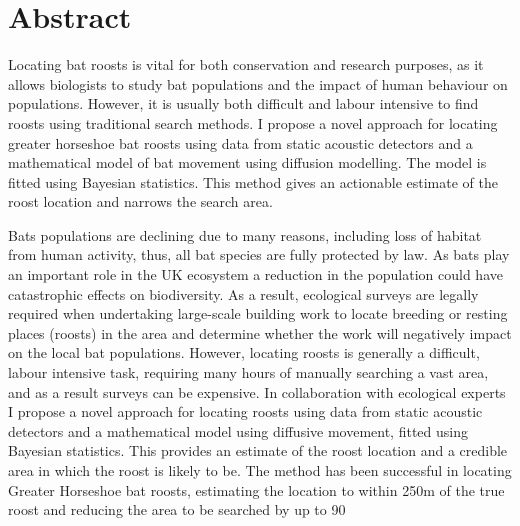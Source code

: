 \section{Abstract}

Locating bat roosts is vital for both conservation and research purposes, as it
allows biologists to study bat populations and the impact of human behaviour on
populations. However, it is usually both difficult and labour intensive to find
roosts using traditional search methods. I propose a novel approach for locating
greater horseshoe bat roosts using data from static acoustic detectors and a
mathematical model of bat movement using diffusion modelling. The model is
fitted using Bayesian statistics. This method gives an actionable estimate of
the roost location and narrows the search area.



Bats populations are declining due to many reasons, including loss of habitat from human activity, thus, all bat species are fully protected by law. As bats play an important role in the UK ecosystem a reduction in the population could have catastrophic effects on biodiversity. As a result, ecological surveys are legally required when undertaking large-scale building work to locate breeding or resting places (roosts) in the area and determine whether the work will negatively impact on the local bat populations. However, locating roosts is generally a difficult, labour intensive task, requiring many hours of manually searching a vast area, and as a result surveys can be expensive. In collaboration with ecological experts I propose a novel approach for locating roosts using data from static acoustic detectors and a mathematical model using diffusive movement, fitted using Bayesian statistics. This provides an estimate of the roost location and a credible area in which the roost is likely to be. The method has been successful in locating Greater Horseshoe bat roosts, estimating the location to within 250m of the true roost and reducing the area to be searched by up to 90%
